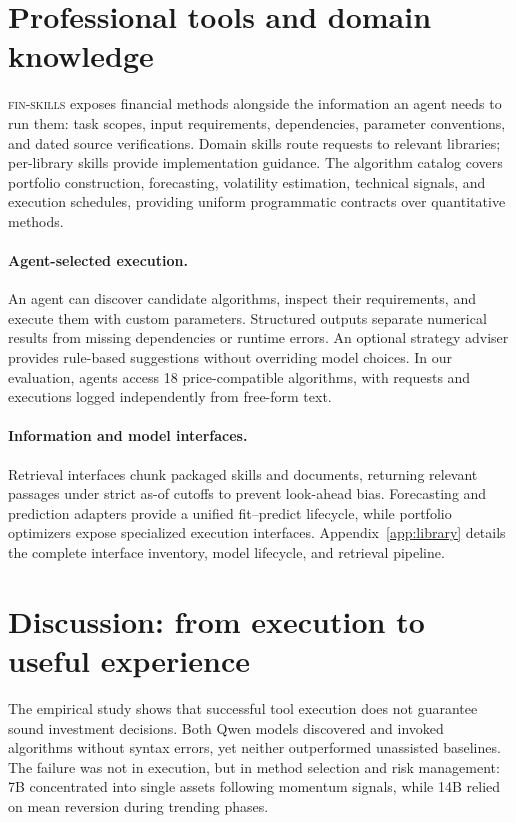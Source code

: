 \documentclass[11pt]{article}
\begin{document}


\section{Professional tools and domain knowledge}
\label{sec:library}
\textsc{fin-skills} exposes financial methods alongside the information an agent needs
to run them: task scopes, input requirements, dependencies, parameter conventions, and
dated source verifications. Domain skills route requests to relevant libraries; per-library
skills provide implementation guidance. The algorithm catalog covers portfolio
construction, forecasting, volatility estimation, technical signals, and execution
schedules, providing uniform programmatic contracts over quantitative methods.

\paragraph{Agent-selected execution.}
An agent can discover candidate algorithms, inspect their requirements, and execute them
with custom parameters. Structured outputs separate numerical results from missing
dependencies or runtime errors. An optional strategy adviser provides rule-based
suggestions without overriding model choices. In our evaluation, agents access 18
price-compatible algorithms, with requests and executions logged independently from
free-form text.

\paragraph{Information and model interfaces.}
Retrieval interfaces chunk packaged skills and documents, returning relevant passages
under strict as-of cutoffs to prevent look-ahead bias. Forecasting and prediction
adapters provide a unified fit--predict lifecycle, while portfolio optimizers expose
specialized execution interfaces. Appendix~\ref{app:library} details the complete
interface inventory, model lifecycle, and retrieval pipeline.






\section{Discussion: from execution to useful experience}
The empirical study shows that successful tool execution does not guarantee sound
investment decisions. Both Qwen models discovered and invoked algorithms without syntax
errors, yet neither outperformed unassisted baselines. The failure was not in execution,
but in method selection and risk management: 7B concentrated into single assets following
momentum signals, while 14B relied on mean reversion during trending phases.
\end{document}
